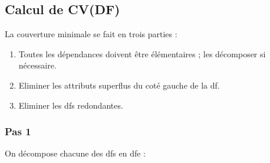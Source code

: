\documentclass[a4paper,sffamily,12pt]{article}
\begin{document}
		\subsection{Calcul de CV(DF)}

			\vspace{0.5cm}

			\noindent La couverture minimale se fait en trois parties :

			\begin{enumerate}[label=\ding{228}]
				\item Toutes les dépendances doivent être élémentaires ; les décomposer si nécessaire.
				\item Eliminer les attributs superflus du coté gauche de la df.
				\item Eliminer les dfs redondantes.
			\end{enumerate}	
			
			\vspace{0.5cm}
				
			\subsubsection{Pas 1}

				\vspace{0.5cm}

				\noindent On décompose chacune des dfs en dfe : \\
\end{document}
